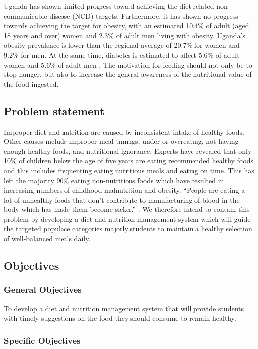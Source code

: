 \documentclass{article}
\begin{document}
Uganda has shown limited progress toward achieving the diet-related non-communicable disease (NCD) targets. Furthermore, it has shown no progress towards achieving the target for obesity, with an estimated 10.4\% of adult (aged 18 years and over) women and 2.3\% of adult men living with obesity. Uganda's obesity prevalence is lower than the regional average of 20.7\% for women and 9.2\% for men. At the same time, diabetes is estimated to affect 5.6\% of adult women and 5.6\% of adult men \cite{globalnutritionreport}. The motivation for feeding should not only be to stop hunger, but also to increase the general awareness of the nutritional value of the food ingested.

\subsection{Problem statement}
Improper diet and nutrition are caused by inconsistent intake of healthy foods. Other causes include improper meal timings, under or overeating, not having enough healthy foods, and nutritional ignorance. Experts have revealed that only 10\% of children below the age of five years are eating recommended healthy foods and this includes frequenting eating nutritious meals and eating on time. This has left the majority 90\% eating non-nutritious foods which have resulted in increasing numbers of childhood malnutrition and obesity\cite{newvision}. “People are eating a lot of unhealthy foods that don’t contribute to manufacturing of blood in the body which has made them become sicker.” \cite{newvision}. We therefore intend to contain this problem by developing a diet and nutrition management system which will guide the targeted populace categories majorly students to maintain a healthy selection of well-balanced meals daily.

\subsection{Objectives}
\subsubsection{General Objectives}

To develop a diet and nutrition management system that will provide students with timely suggestions on the food they should consume to remain healthy. 

\subsubsection{Specific Objectives}
\end{document}
